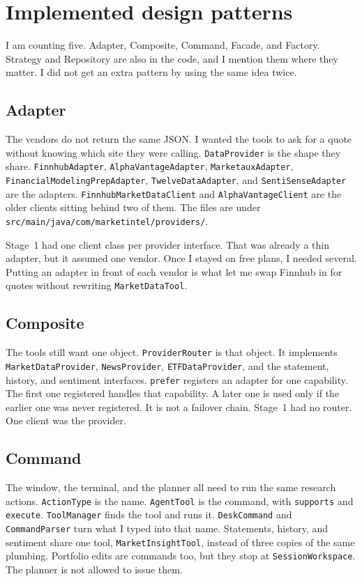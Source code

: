 \documentclass[11pt]{article}
\begin{document}
\section{Implemented design patterns}

I am counting five. Adapter, Composite, Command, Facade, and Factory. Strategy and Repository are also in the code, and I mention them where they matter. I did not get an extra pattern by using the same idea twice.

\subsection{Adapter}
The vendors do not return the same JSON. I wanted the tools to ask for a quote without knowing which site they were calling. \texttt{DataProvider} is the shape they share. \texttt{FinnhubAdapter}, \texttt{AlphaVantageAdapter}, \texttt{MarketauxAdapter}, \texttt{FinancialModelingPrepAdapter}, \texttt{TwelveDataAdapter}, and \texttt{SentiSenseAdapter} are the adapters. \texttt{FinnhubMarketDataClient} and \texttt{AlphaVantageClient} are the older clients sitting behind two of them. The files are under \texttt{src/main/java/com/marketintel/providers/}.

Stage~1 had one client class per provider interface. That was already a thin adapter, but it assumed one vendor. Once I stayed on free plans, I needed several. Putting an adapter in front of each vendor is what let me swap Finnhub in for quotes without rewriting \texttt{MarketDataTool}.

\subsection{Composite}
The tools still want one object. \texttt{ProviderRouter} is that object. It implements \texttt{MarketDataProvider}, \texttt{NewsProvider}, \texttt{ETFDataProvider}, and the statement, history, and sentiment interfaces. \texttt{prefer} registers an adapter for one capability. The first one registered handles that capability. A later one is used only if the earlier one was never registered. It is not a failover chain. Stage~1 had no router. One client was the provider.

\subsection{Command}
The window, the terminal, and the planner all need to run the same research actions. \texttt{ActionType} is the name. \texttt{AgentTool} is the command, with \texttt{supports} and \texttt{execute}. \texttt{ToolManager} finds the tool and runs it. \texttt{DeskCommand} and \texttt{CommandParser} turn what I typed into that name. Statements, history, and sentiment share one tool, \texttt{MarketInsightTool}, instead of three copies of the same plumbing. Portfolio edits are commands too, but they stop at \texttt{SessionWorkspace}. The planner is not allowed to issue them.
\end{document}

